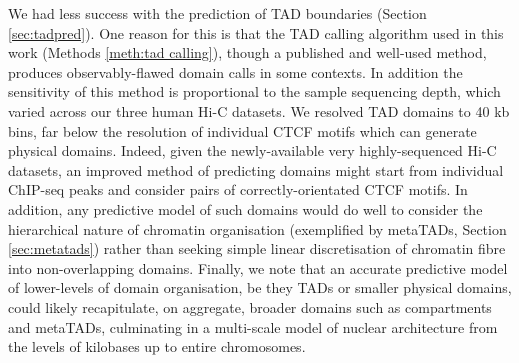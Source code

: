 \documentclass[a4paper,11pt,oneside]{book}
\begin{document}
We had less success with the prediction of TAD boundaries (Section \ref{sec:tadpred}). One reason for this is that the TAD calling algorithm used in this work\cite{Dixon2012} (Methods \ref{meth:tad calling}), though a published and well-used method, produces observably-flawed domain calls in some contexts. In addition the sensitivity of this method is proportional to the sample sequencing depth, which varied across our three human Hi-C datasets. We resolved TAD domains to 40 kb bins, far below the resolution of individual CTCF motifs which can generate physical domains. Indeed, given the newly-available very highly-sequenced Hi-C datasets,\cite{Rao2014} an improved method of predicting domains might start from individual ChIP-seq peaks and consider pairs of correctly-orientated CTCF motifs. In addition, any predictive model of such domains would do well to consider the hierarchical nature of chromatin organisation (exemplified by metaTADs, Section \ref{sec:metatads}) rather than seeking simple linear discretisation of chromatin fibre into non-overlapping domains. Finally, we note that an accurate predictive model of lower-levels of domain organisation, be they TADs or smaller physical domains, could likely recapitulate, on aggregate, broader domains such as compartments and metaTADs, culminating in a multi-scale model of nuclear architecture from the levels of kilobases up to entire chromosomes.


\end{document}
